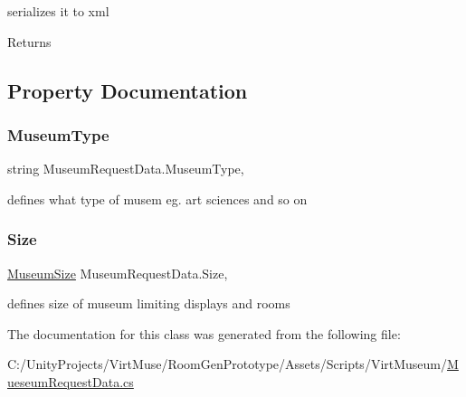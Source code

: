 serializes it to xml 

\begin{DoxyReturn}{Returns}

\end{DoxyReturn}


\subsection{Property Documentation}
\mbox{\label{class_museum_request_data_a2b68f4ddd18c2d01fcd44a02a135b58b}} 
\subsubsection{\texorpdfstring{Museum\+Type}{MuseumType}}
{\footnotesize\ttfamily string Museum\+Request\+Data.\+Museum\+Type\hspace{0.3cm}{\ttfamily [get]}, {\ttfamily [set]}}



defines what type of musem eg. art sciences and so on 

\mbox{\label{class_museum_request_data_a8c9489791297c88de3c37c0fe340858d}} 
\subsubsection{\texorpdfstring{Size}{Size}}
{\footnotesize\ttfamily \mbox{\hyperlink{_mueseum_request_data_8cs_a462fa84e99cf703318040e54f14146a2}{Museum\+Size}} Museum\+Request\+Data.\+Size\hspace{0.3cm}{\ttfamily [get]}, {\ttfamily [set]}}



defines size of museum limiting displays and rooms 



The documentation for this class was generated from the following file\+:\begin{DoxyCompactItemize}
\item 
C\+:/\+Unity\+Projects/\+Virt\+Muse/\+Room\+Gen\+Prototype/\+Assets/\+Scripts/\+Virt\+Museum/\mbox{\hyperlink{_mueseum_request_data_8cs}{Mueseum\+Request\+Data.\+cs}}\end{DoxyCompactItemize}
